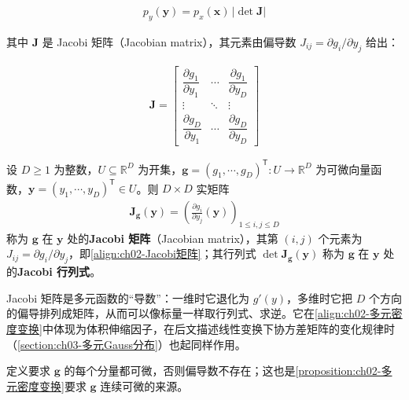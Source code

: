 \documentclass[../../main.tex]{subfiles}
\begin{document}
\begin{align}
  p_y(\mathbf{y}) = p_x(\mathbf{x})\,\big|\det\mathbf{J}\big|
  \label{align:ch02-多元密度变换}
\end{align}

其中 $\mathbf{J}$ 是 Jacobi 矩阵（Jacobian matrix），其元素由偏导数 $J_{ij}=\partial g_i/\partial y_j$ 给出：

\begin{align}
  \mathbf{J} =
  \begin{bmatrix}
    \dfrac{\partial g_1}{\partial y_1} & \cdots & \dfrac{\partial g_1}{\partial y_D} \\
    \vdots & \ddots & \vdots \\
    \dfrac{\partial g_D}{\partial y_1} & \cdots & \dfrac{\partial g_D}{\partial y_D}
  \end{bmatrix}
  \label{align:ch02-Jacobi矩阵}
\end{align}

\begin{definition}[Jacobi 矩阵]\label{definition:ch02-Jacobi矩阵}
设 $D\geqslant1$ 为整数，$U\subseteq\mathbb{R}^{D}$ 为开集，$\mathbf{g}=(g_1,\cdots,g_D)^{\mathsf{T}}:U\to\mathbb{R}^{D}$ 为可微向量函数，$\mathbf{y}=(y_1,\cdots,y_D)^{\mathsf{T}}\in U$。则 $D\times D$ 实矩阵
\begin{align*}
  \mathbf{J}_{\mathbf{g}}(\mathbf{y})=\left(\frac{\partial g_i}{\partial y_j}(\mathbf{y})\right)_{1\leqslant i,j\leqslant D}
\end{align*}
称为 $\mathbf{g}$ 在 $\mathbf{y}$ 处的\textbf{Jacobi 矩阵}（Jacobian matrix），其第 $(i,j)$ 个元素为 $J_{ij}=\partial g_i/\partial y_j$，即\eqref{align:ch02-Jacobi矩阵}；其行列式 $\det\mathbf{J}_{\mathbf{g}}(\mathbf{y})$ 称为 $\mathbf{g}$ 在 $\mathbf{y}$ 处的\textbf{Jacobi 行列式}。
\end{definition}

\begin{remark}
Jacobi 矩阵是多元函数的“导数”：一维时它退化为 $g'(y)$，多维时它把 $D$ 个方向的偏导排列成矩阵，从而可以像标量一样取行列式、求逆。它在\eqref{align:ch02-多元密度变换}中体现为体积伸缩因子，在后文描述线性变换下协方差矩阵的变化规律时（\cref{section:ch03-多元Gauss分布}）也起同样作用。

定义要求 $\mathbf{g}$ 的每个分量都可微，否则偏导数不存在；这也是\cref{proposition:ch02-多元密度变换}要求 $\mathbf{g}$ 连续可微的来源。
\end{remark}
\end{document}
